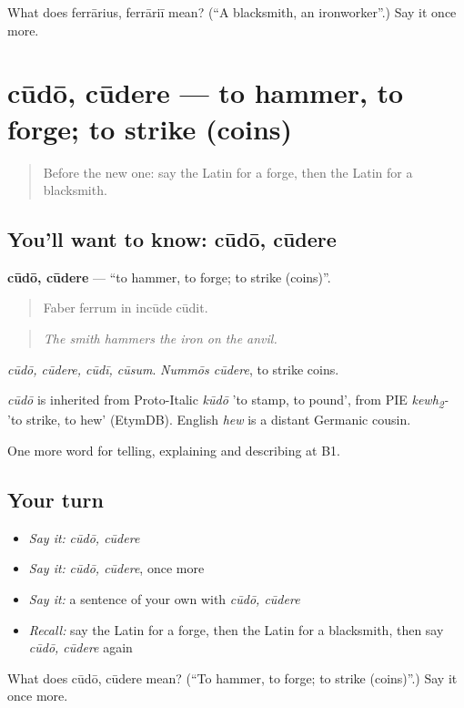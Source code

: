 \begin{tcolorbox}[breakable,colback=teal!4,colframe=teal!35!black,title={Before you move on}]
What does ferrārius, ferrāriī mean? (\textquotedblleft{}A blacksmith, an ironworker\textquotedblright{}.) Say it once more.
\end{tcolorbox}
\section[cūdō, cūdere]{cūdō, cūdere — to hammer, to forge; to strike (coins)}

\label{lesson:LA-C469-cudo}



\begin{quote}
Before the new one: say the Latin for a forge, then the Latin for a blacksmith.
\end{quote}

\subsection*{You'll want to know: cūdō, cūdere}
\textbf{cūdō, cūdere} — \textquotedblleft{}to hammer, to forge; to strike (coins)\textquotedblright{}.

\begin{quote}
Faber ferrum in incūde cūdit.
\end{quote}

\begin{quote}
\emph{The smith hammers the iron on the anvil.}
\end{quote}

\emph{cūdō, cūdere, cūdī, cūsum}. \emph{Nummōs cūdere}, to strike coins.

\begin{cousinweb}
\emph{cūdō} is inherited from Proto-Italic \emph{kūdō} 'to stamp, to pound', from PIE \emph{kewh\textsubscript{2}-} 'to strike, to hew' (EtymDB). English \emph{hew} is a distant Germanic cousin.
\end{cousinweb}

\begin{grammarlens}[title={What you've built}]
One more word for telling, explaining and describing at B1.
\end{grammarlens}

\subsection*{Your turn}
\begin{itemize}
\raggedright
  \item \emph{Say it:} \emph{cūdō, cūdere}
  \item \emph{Say it:} \emph{cūdō, cūdere}, once more
  \item \emph{Say it:} a sentence of your own with \emph{cūdō, cūdere}
  \item \emph{Recall:} say the Latin for a forge, then the Latin for a blacksmith, then say \emph{cūdō, cūdere} again
\end{itemize}

\begin{tcolorbox}[breakable,colback=teal!4,colframe=teal!35!black,title={Before you move on}]
What does cūdō, cūdere mean? (\textquotedblleft{}To hammer, to forge; to strike (coins)\textquotedblright{}.) Say it once more.
\end{tcolorbox}
